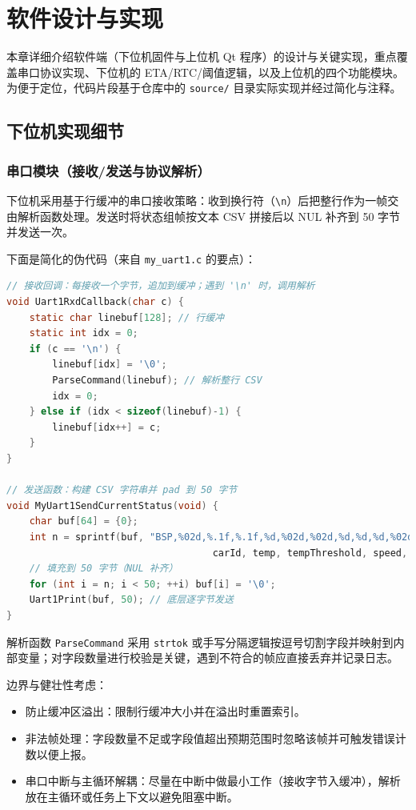 \documentclass[12pt]{article}
\begin{document}
\section{软件设计与实现}
本章详细介绍软件端（下位机固件与上位机 Qt 程序）的设计与关键实现，重点覆盖串口协议实现、下位机的 ETA/RTC/阈值逻辑，以及上位机的四个功能模块。为便于定位，代码片段基于仓库中的 \texttt{source/} 目录实际实现并经过简化与注释。

\subsection{下位机实现细节}
\subsubsection{串口模块（接收/发送与协议解析）}
下位机采用基于行缓冲的串口接收策略：收到换行符（\texttt{\textbackslash n}）后把整行作为一帧交由解析函数处理。发送时将状态组帧按文本 CSV 拼接后以 NUL 补齐到 50 字节并发送一次。

下面是简化的伪代码（来自 \texttt{my\_uart1.c} 的要点）：
\begin{lstlisting}[language=C]
// 接收回调：每接收一个字节，追加到缓冲；遇到 '\n' 时，调用解析
void Uart1RxdCallback(char c) {
	static char linebuf[128]; // 行缓冲
	static int idx = 0;
	if (c == '\n') {
		linebuf[idx] = '\0';
		ParseCommand(linebuf); // 解析整行 CSV
		idx = 0;
	} else if (idx < sizeof(linebuf)-1) {
		linebuf[idx++] = c;
	}
}

// 发送函数：构建 CSV 字符串并 pad 到 50 字节
void MyUart1SendCurrentStatus(void) {
	char buf[64] = {0};
	int n = sprintf(buf, "BSP,%02d,%.1f,%.1f,%d,%02d,%02d,%d,%d,%d,%02d,%02d,%02d\n",
									carId, temp, tempThreshold, speed, etaMin, etaSec, mode, door, alarm, hour, minute, second);
	// 填充到 50 字节（NUL 补齐）
	for (int i = n; i < 50; ++i) buf[i] = '\0';
	Uart1Print(buf, 50); // 底层逐字节发送
}
\end{lstlisting}

解析函数 \texttt{ParseCommand} 采用 \texttt{strtok} 或手写分隔逻辑按逗号切割字段并映射到内部变量；对字段数量进行校验是关键，遇到不符合的帧应直接丢弃并记录日志。

边界与健壮性考虑：
\begin{itemize}
\item 防止缓冲区溢出：限制行缓冲大小并在溢出时重置索引。
\item 非法帧处理：字段数量不足或字段值超出预期范围时忽略该帧并可触发错误计数以便上报。
\item 串口中断与主循环解耦：尽量在中断中做最小工作（接收字节入缓冲），解析放在主循环或任务上下文以避免阻塞中断。
\end{itemize}
\end{document}
